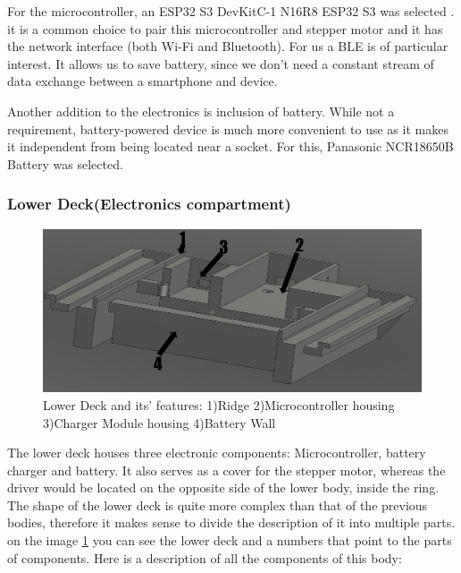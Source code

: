 For the microcontroller, an ESP32 S3 DevKitC-1 N16R8 ESP32 S3 was selected \cite{microcontroller}. it is a common choice to pair this microcontroller and stepper motor and it has the network interface (both Wi-Fi and Bluetooth). For us a \ac{BLE} is of particular interest. It allows us to save battery, since we don't need a constant stream of data exchange between a smartphone and device.

Another addition to the electronics is inclusion of battery. While not a requirement, battery-powered device is much more convenient to use as it makes it independent from being located near a socket. For this, Panasonic NCR18650B \cite{panasonic_ncr18650b} Battery was selected. 
\newpage
\subsubsection{Lower Deck(Electronics compartment)}
\begin{figure}[h]
	\centering
	\includegraphics[width=0.7\linewidth]{Figures/Screenshot_13}
	\caption[Lower Deck]{Lower Deck and its' features: 1)Ridge 2)Microcontroller housing 3)Charger Module housing 4)Battery Wall}
	\label{fig:screenshot13}
\end{figure}
The lower deck houses three electronic components: Microcontroller, battery charger and battery. It also serves as a cover for the stepper motor, whereas the driver would be located on the opposite side of the lower body, inside the ring. The shape of the lower deck is quite more complex than that of the previous bodies, therefore it makes sense to divide the description of it into multiple parts. on the image \ref{fig:screenshot13} you can see the lower deck and a numbers that point to the parts of components. Here is a description of all the components of this body:
